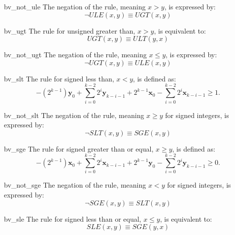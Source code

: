 \begin{RuleDescription}{bv_not_ule}
    The negation of the \currule{} rule, meaning $x > y$, is expressed by:
    \[
        \neg ULE(x, y) \equiv UGT(x, y)
    \]
\end{RuleDescription}

\begin{RuleDescription}{bv_ugt}
    The \currule{} rule for unsigned greater than, $x > y$, is equivalent to:
    \[
        UGT(x, y) \equiv ULT(y, x)
    \]
\end{RuleDescription}

\begin{RuleDescription}{bv_not_ugt}
    The negation of the \currule{} rule, meaning $x \leq y$, is expressed by:
    \[
        \neg UGT(x, y) \equiv ULE(x, y)
    \]
\end{RuleDescription}

\begin{RuleDescription}{bv_slt}
    The \currule{} rule for signed less than, $x < y$, is defined as:
    \[
        -(2^{k-1})\mathbf{y}_0 + \sum_{i=0}^{k-2} 2^i\mathbf{y}_{k-i-1} + 2^{k-1} \mathbf{x}_{0} - \sum_{i=0}^{k-2} 2^i\mathbf{x}_{k-i-1} \geq 1.
    \]
\end{RuleDescription}

\begin{RuleDescription}{bv_not_slt}
    The negation of the \currule{} rule, meaning $x \geq y$ for signed integers, is expressed by:
    \[
        \neg SLT(x, y) \equiv SGE(x, y)
    \]
\end{RuleDescription}

\begin{RuleDescription}{bv_sge}
    The \currule{} rule for signed greater than or equal, $x \geq y$, is defined as:
    \[
        -(2^{k-1})\mathbf{x}_0 + \sum_{i=0}^{k-2} 2^i\mathbf{x}_{k-i-1} + 2^{k-1}\mathbf{y}_0 - \sum_{i=0}^{k-2} 2^i\mathbf{y}_{k-i-1} \geq 0.
    \]
\end{RuleDescription}

\begin{RuleDescription}{bv_not_sge}
    The negation of the \currule{} rule, meaning $x < y$ for signed integers, is expressed by:
    \[
        \neg SGE(x, y) \equiv SLT(x, y)
    \]
\end{RuleDescription}

\begin{RuleDescription}{bv_sle}
    The \currule{} rule for signed less than or equal, $x \leq y$, is equivalent to:
    \[
        SLE(x, y) \equiv SGE(y, x)
    \]
\end{RuleDescription}

